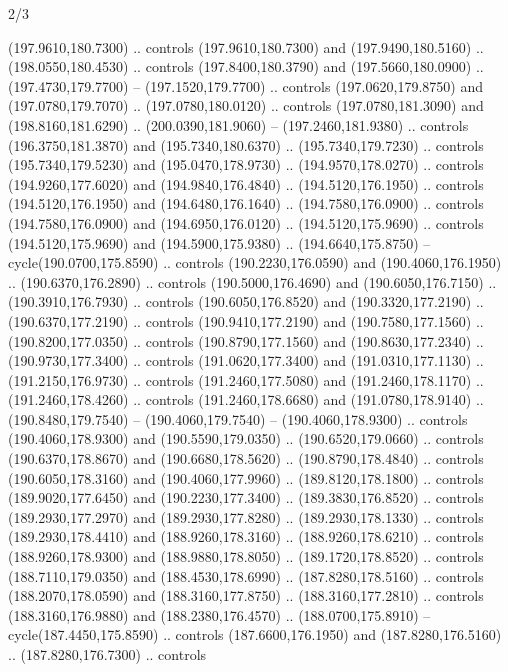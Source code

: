 \begin{flagdescription}{2/3}
\begin{scope}[xshift=0.5\flaglength,yshift=0.5\flagwidth,scale=\flagwidth/259.2]
\begin{scope}[y=0.8pt, x=0.8pt, yscale=-1,shift={(-243,-162)}]
      (197.9610,180.7300) .. controls (197.9610,180.7300) and (197.9490,180.5160) ..
      (198.0550,180.4530) .. controls (197.8400,180.3790) and (197.5660,180.0900) ..
      (197.4730,179.7700) -- (197.1520,179.7700) .. controls (197.0620,179.8750) and
      (197.0780,179.7070) .. (197.0780,180.0120) .. controls (197.0780,181.3090) and
      (198.8160,181.6290) .. (200.0390,181.9060) -- (197.2460,181.9380) .. controls
      (196.3750,181.3870) and (195.7340,180.6370) .. (195.7340,179.7230) .. controls
      (195.7340,179.5230) and (195.0470,178.9730) .. (194.9570,178.0270) .. controls
      (194.9260,177.6020) and (194.9840,176.4840) .. (194.5120,176.1950) .. controls
      (194.5120,176.1950) and (194.6480,176.1640) .. (194.7580,176.0900) .. controls
      (194.7580,176.0900) and (194.6950,176.0120) .. (194.5120,175.9690) .. controls
      (194.5120,175.9690) and (194.5900,175.9380) .. (194.6640,175.8750) --
      cycle(190.0700,175.8590) .. controls (190.2230,176.0590) and
      (190.4060,176.1950) .. (190.6370,176.2890) .. controls (190.5000,176.4690) and
      (190.6050,176.7150) .. (190.3910,176.7930) .. controls (190.6050,176.8520) and
      (190.3320,177.2190) .. (190.6370,177.2190) .. controls (190.9410,177.2190) and
      (190.7580,177.1560) .. (190.8200,177.0350) .. controls (190.8790,177.1560) and
      (190.8630,177.2340) .. (190.9730,177.3400) .. controls (191.0620,177.3400) and
      (191.0310,177.1130) .. (191.2150,176.9730) .. controls (191.2460,177.5080) and
      (191.2460,178.1170) .. (191.2460,178.4260) .. controls (191.2460,178.6680) and
      (191.0780,178.9140) .. (190.8480,179.7540) -- (190.4060,179.7540) --
      (190.4060,178.9300) .. controls (190.4060,178.9300) and (190.5590,179.0350) ..
      (190.6520,179.0660) .. controls (190.6370,178.8670) and (190.6680,178.5620) ..
      (190.8790,178.4840) .. controls (190.6050,178.3160) and (190.4060,177.9960) ..
      (189.8120,178.1800) .. controls (189.9020,177.6450) and (190.2230,177.3400) ..
      (189.3830,176.8520) .. controls (189.2930,177.2970) and (189.2930,177.8280) ..
      (189.2930,178.1330) .. controls (189.2930,178.4410) and (188.9260,178.3160) ..
      (188.9260,178.6210) .. controls (188.9260,178.9300) and (188.9880,178.8050) ..
      (189.1720,178.8520) .. controls (188.7110,179.0350) and (188.4530,178.6990) ..
      (187.8280,178.5160) .. controls (188.2070,178.0590) and (188.3160,177.8750) ..
      (188.3160,177.2810) .. controls (188.3160,176.9880) and (188.2380,176.4570) ..
      (188.0700,175.8910) -- cycle(187.4450,175.8590) .. controls
      (187.6600,176.1950) and (187.8280,176.5160) .. (187.8280,176.7300) .. controls

\end{scope}
\end{scope}
\end{flagdescription}
